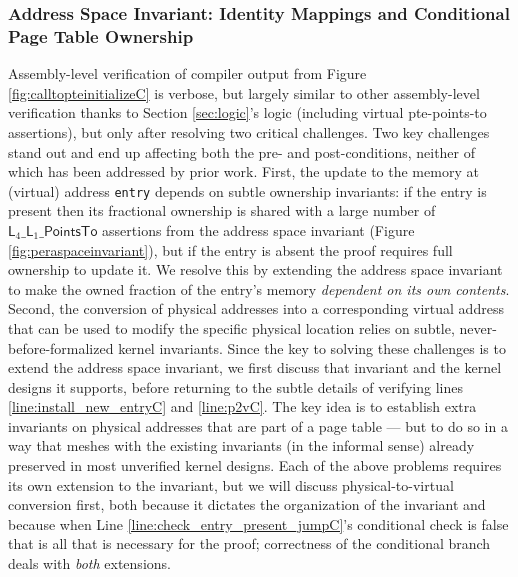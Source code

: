 \subsubsection{Address Space Invariant: Identity Mappings and Conditional Page Table Ownership}
\label{subsec:identitymappingsC}
Assembly-level verification of compiler output from Figure \ref{fig:calltopteinitializeC} is verbose, but largely
similar to other assembly-level verification thanks to Section \ref{sec:logic}'s logic (including virtual pte-points-to
assertions),
but only after resolving two critical challenges.
Two key challenges stand out and end up affecting both the pre- and post-conditions, neither of which has been addressed by prior work.
First, the update to the memory at (virtual) address \lstinline|entry| depends on subtle ownership invariants:
if the entry is present then its fractional ownership is shared with a large number of $\textsf{L}_{4}\_\textsf{L}_{1}\_\textsf{PointsTo}$ assertions
from the address space invariant (Figure \ref{fig:peraspaceinvariant}),
but if the entry is absent the proof requires full ownership to update it. We resolve this by extending the address space invariant
to make the owned fraction of the entry's memory \emph{dependent on its own contents}.
Second, the conversion of physical addresses into a corresponding virtual address that can be used to modify the specific
physical location relies on subtle, never-before-formalized kernel invariants.
%
Since the key to solving these challenges is to extend the address space invariant, we
first discuss that invariant and the kernel designs it supports, before returning to the subtle details of
verifying lines \ref{line:install_new_entryC} and \ref{line:p2vC}.
The key idea is to establish extra invariants on physical addresses that are part of a page table ---
but to do so in a way that meshes with the existing invariants (in the informal sense) already preserved in most
unverified kernel designs.
Each of the above problems requires its own extension to the invariant, but we will discuss
physical-to-virtual conversion first, both because it dictates the organization of the invariant
and because when Line \ref{line:check_entry_present_jumpC}'s
conditional check is false that is all that is necessary for the proof; correctness of the conditional branch deals with \emph{both}
extensions.

